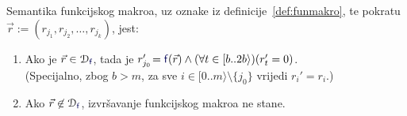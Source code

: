 \begin{propozicija}[{name=[semantika funkcijskog makroa]}]\label{prop:semfmacro}
Semantika funkcijskog makroa, uz oznake iz definicije~\ref{def:funmakro}, te pokratu $\vec r:=(r_{j_1},r_{j_2},\dotsc,r_{j_k})$, jest:
\begin{enumerate}
    \item\label{case:in} Ako je $\vec r\in\dom{\f{f}}$, tada je $r_{j_0}'\!=\f{f}(\vec r)\land(\forall t\in[b..2b\rangle)(r_t'=0)$.\\
    (Specijalno, zbog $b>m$, za sve $i\in[0..m\rangle\setminus\{j_0\}$ vrijedi $r_i'=r_i$.)
    \item\label{case:notin} Ako $\vec r\not\in\dom{\f{f}}$, izvršavanje funkcijskog makroa ne stane.
\end{enumerate}
\end{propozicija}
